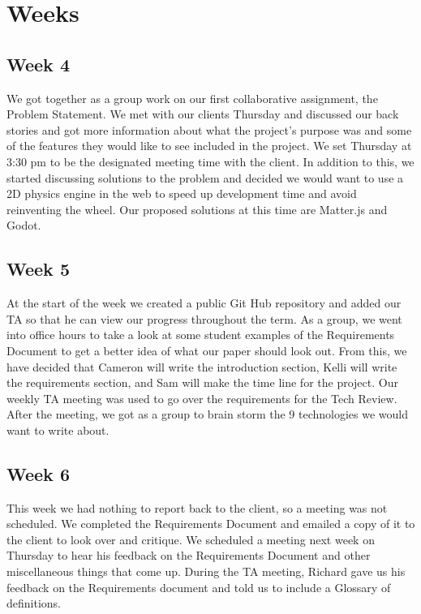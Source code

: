 \documentclass[onecolumn, draftclsnofoot,10pt, compsoc]{IEEEtran}
\begin{document}
\section{Weeks}

\subsection{Week 4}
We got together as a group work on our first collaborative assignment, the Problem Statement. We met with our clients Thursday and discussed our back stories and got more information about what the project's purpose was and some of the features they would like to see included in the project. We set Thursday at 3:30 pm to be the designated meeting time with the client. In addition to this, we started discussing solutions to the problem and decided we would want to use a 2D physics engine in the web to speed up development time and avoid reinventing the wheel. Our proposed solutions at this time are Matter.js and Godot. 

\subsection{Week 5}
At the start of the week we created a public Git Hub repository and added our TA so that he can view our progress throughout the term. As a group, we went into office hours to take a look at some student examples of the Requirements Document to get a better idea of what our paper should look out. From this, we have decided that Cameron will write the introduction section, Kelli will write the requirements section, and Sam will make the time line for the project. Our weekly TA meeting was used to go over the requirements for the Tech Review. After the meeting, we got as a group to brain storm the 9 technologies we would want to write about. 

\subsection{Week 6}
This week we had nothing to report back to the client, so a meeting was not scheduled. We completed the Requirements Document and emailed a copy of it to the client to look over and critique. We scheduled a meeting next week on Thursday to hear his feedback on the Requirements Document and other miscellaneous things that come up. During the TA meeting, Richard gave us his feedback on the Requirements document and told us to include a Glossary of definitions.   
\end{document}

